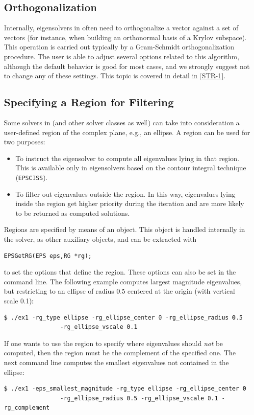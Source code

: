 \subsection{Orthogonalization}
\label{sec:orthog}

Internally, eigensolvers in  often need to orthogonalize a vector against a set of vectors (for instance, when building an orthonormal basis of a Krylov subspace). This operation is carried out typically by a Gram-Schmidt orthogonalization procedure. The user is able to adjust several options related to this algorithm, although the default behavior is good for most cases, and we strongly suggest not to change any of these settings. This topic is covered in detail in \hyperlink{str}{[STR-1]}.

\subsection{Specifying a Region for Filtering}
\label{sec:region}

Some solvers in  (and other solver classes as well) can take into consideration a user-defined region of the complex plane, e.g., an ellipse. A region can be used for two purposes:
\begin{itemize}
\setlength{\itemsep}{0pt}
\item To instruct the eigensolver to compute all eigenvalues lying in that region. This is available only in eigensolvers based on the contour integral technique (\texttt{EPSCISS}).
\item To filter out eigenvalues outside the region. In this way, eigenvalues lying inside the region get higher priority during the iteration and are more likely to be returned as computed solutions.
\end{itemize}

Regions are specified by means of an  object. This object is handled internally in the  solver, as other auxiliary objects, and can be extracted with
        \begin{Verbatim}[fontsize=\small]
        EPSGetRG(EPS eps,RG *rg);
        \end{Verbatim}
to set the options that define the region. These options can also be set in the command line. The following example computes largest magnitude eigenvalues, but restricting to an ellipse of radius 0.5 centered at the origin (with vertical scale 0.1):
\begin{Verbatim}[fontsize=\footnotesize,numbers=none]
        $ ./ex1 -rg_type ellipse -rg_ellipse_center 0 -rg_ellipse_radius 0.5
                -rg_ellipse_vscale 0.1
\end{Verbatim}
If one wants to use the region to specify where eigenvalues should \emph{not} be computed, then the region must be the complement of the specified one. The next command line computes the smallest eigenvalues not contained in the ellipse:
\begin{Verbatim}[fontsize=\footnotesize,numbers=none]
        $ ./ex1 -eps_smallest_magnitude -rg_type ellipse -rg_ellipse_center 0
                -rg_ellipse_radius 0.5 -rg_ellipse_vscale 0.1 -rg_complement
\end{Verbatim}

